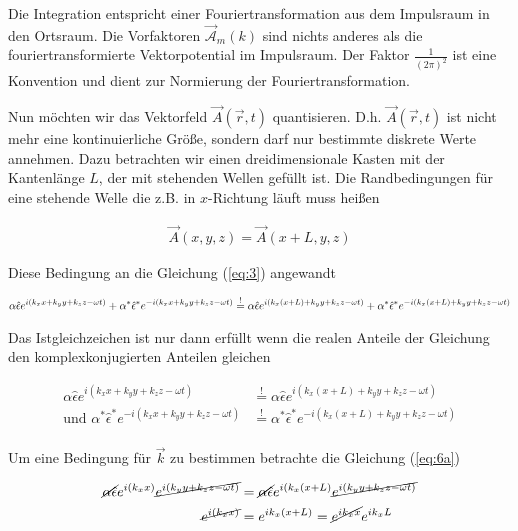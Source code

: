 Die Integration entspricht einer Fouriertransformation aus dem Impulsraum in den Ortsraum. Die Vorfaktoren \(\vec{\mathcal A}_m(k)\) sind nichts anderes als die fouriertransformierte Vektorpotential im Impulsraum. Der Faktor \(\frac{1}{(2\pi)^2}\) ist eine Konvention und dient zur Normierung der Fouriertransformation.

Nun möchten wir das Vektorfeld \(\vec A(\vec r, t)\) quantisieren. D.h. \(\vec A(\vec r, t)\) ist nicht mehr eine kontinuierliche Größe, sondern darf nur bestimmte diskrete Werte annehmen. Dazu betrachten wir einen dreidimensionale Kasten mit der Kantenlänge \(L\), der mit stehenden Wellen gefüllt ist. Die Randbedingungen für eine stehende Welle die z.B. in \(x\)-Richtung läuft muss heißen

\begin{align}
  \label{eq:4}
  \vec A(x,y,z) = \vec A(x+L,y,z)
\end{align}

Diese Bedingung an die Gleichung (\ref{eq:3}) angewandt

\begin{align}
  \label{eq:5}
  \alpha\hat \epsilon e^{i(k_x x+k_y y+k_z z -\omega t)} + \alpha^*\hat \epsilon^* e^{-i(k_x x+k_y y+k_z z-\omega t)} &\stackrel{!}= \alpha\hat \epsilon e^{i(k_x (x+L)+k_y y+k_z z -\omega t)} + \alpha^*\hat \epsilon^* e^{-i(k_x (x+L)+k_y y+k_z z-\omega t)} \notag\\
\end{align}

Das Istgleichzeichen ist nur dann erfüllt wenn die realen Anteile der Gleichung den komplexkonjugierten Anteilen gleichen


\begin{subequations}
\begin{align}
  \alpha\hat \epsilon e^{i(k_x x+k_y y+k_z z -\omega t)} &\stackrel{!}= \alpha\hat \epsilon e^{i(k_x (x+L)+k_y y+k_z z -\omega t)}\label{eq:6a} \\
\text{und }\alpha^*\hat \epsilon^* e^{-i(k_x x+k_y y+k_z z-\omega t)} &\stackrel{!}=\alpha^*\hat \epsilon^* e^{-i(k_x (x+L)+k_y y+k_z z-\omega t)} \label{eq:6b} \\
\end{align}
\end{subequations}

Um eine Bedingung für \(\vec k\) zu bestimmen betrachte die Gleichung (\ref{eq:6a}) 

\begin{align}
  \label{eq:7}
   \cancel{\alpha\hat \epsilon} e^{i(k_x x)}\cancel{e^{i(k_y y+k_z z -\omega t)}} &= \cancel{\alpha\hat \epsilon} e^{i(k_x (x+L)}\cancel{e^{i(k_y y+k_z z -\omega t)}} \notag\\
    \cancel{e^{i(k_x x)}} &=  e^{ik_x (x+L)} = \cancel{e^{ik_x x}}e^{i k_x L}
\end{align}

